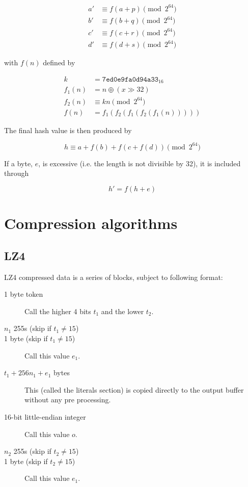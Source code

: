 \documentclass[11pt,a4paper]{report}
\begin{document}
        \begin{align*}
            a' &\equiv f(a + p) \pmod{2^{64}} \\
            b' &\equiv f(b + q) \pmod{2^{64}} \\
            c' &\equiv f(c + r) \pmod{2^{64}} \\
            d' &\equiv f(d + s) \pmod{2^{64}}
        \end{align*}

        with $f(n)$ defined by

        \begin{align*}
            k      &=      \texttt{7ed0e9fa0d94a33}_{16} \\
            f_1(n) &=      n \oplus (x \gg 32) \\
            f_2(n) &\equiv kn \pmod{2^{64}} \\
            f(n)   &=      f_1(f_2(f_1(f_2(f_1(n)))))
        \end{align*}

        The final hash value is then produced by

        $$h \equiv a + f(b) + f(c + f(d)) \pmod{2^{64}}$$

        If a byte, $e$, is excessive (i.e. the length is not divisible by 32), it is included through

        $$h' = f(h + e)$$

    \section{Compression algorithms}
        \subsection{LZ4}
        \label{compression:lz4}
        LZ4 compressed data is a series of blocks, subject to following format:

        \begin{description}
            \item [1 byte token] Call the higher 4 bits $t_1$ and the lower $t_2$.
            \item [$n_1$ 255s (skip if $t_1 \neq 15$)]
            \item [1 byte (skip if $t_1 \neq 15$)] Call this value $e_1$.
            \item [$t_1 + 256n_1 + e_1$ bytes] This (called the literals
                section) is copied directly to the output buffer without any
                pre processing.
            \item [16-bit little-endian integer] Call this value $o$.
            \item [$n_2$ 255s (skip if $t_2 \neq 15$)]
            \item [1 byte (skip if $t_2 \neq 15$)] Call this value $e_1$.
        \end{description}
\end{document}
